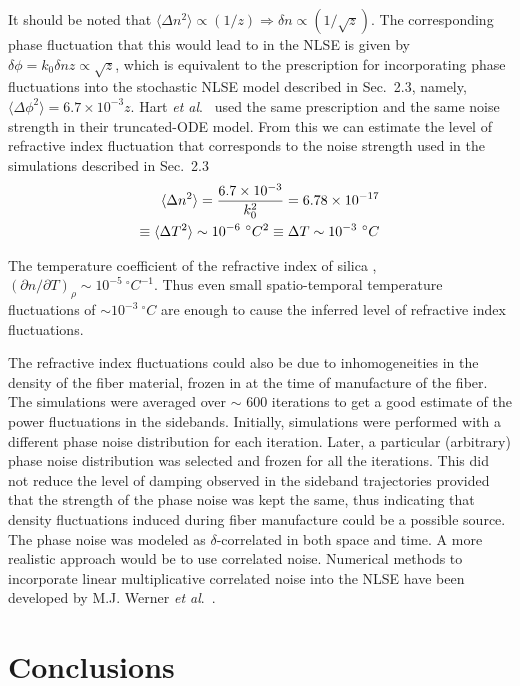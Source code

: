 It should be noted that $\langle \Delta n^2 \rangle \propto (1/z) \Rightarrow \delta n \propto  (1 / \sqrt{z})$. The corresponding phase fluctuation that this would lead to in the NLSE is given by $\delta \phi=k_{0} \delta n z \propto \sqrt {z}$, which is equivalent to the prescription for incorporating phase fluctuations into the stochastic NLSE model described in Sec.\ 2.3, namely,  $\langle \Delta \phi^2 \rangle = 6.7 \times 10^{-3}z$. Hart {\it et al}.\ \cite{hart1} used the same prescription and the same noise strength in their truncated-ODE model. From this we can estimate the level of refractive index fluctuation that corresponds to the noise strength used in the simulations described in Sec.\ 2.3
\begin{eqnarray}
\langle \Delta n^2 \rangle = {6.7 \times 10^{-3} \over k_0^2} = 6.78 \times 10^{-17} \nonumber\\
\equiv \langle \Delta T^{2} \rangle \sim 10^{-6}~{^\circ}C^2 \equiv \Delta T \sim 10^{-3}~{^\circ}C
\end{eqnarray}

The temperature coefficient of the refractive index of silica \cite{glenn},
$(\partial n / \partial T)_{\rho} \sim 10^{-5} ~{^\circ}C^{-1}$. Thus even small spatio-temporal temperature fluctuations of $\sim 10^{-3} ~{^\circ}C$ are enough to cause the inferred level of refractive index fluctuations.

The refractive index fluctuations could also be due to inhomogeneities in the
density of the fiber material, frozen in at the time of manufacture of the
fiber. The simulations were averaged over $\sim$ 600 iterations to get a good
estimate of the power fluctuations in the sidebands. Initially, simulations
were performed with a different phase noise distribution for each iteration.
Later, a particular (arbitrary) phase noise distribution was selected and
frozen for all the iterations.
This did not reduce the level of damping observed in the sideband trajectories
provided that the strength of the phase noise was kept the same, thus
indicating that density fluctuations induced during fiber manufacture could be
a possible source. The phase noise was modeled as $\delta$-correlated in
both space and time. A more realistic approach would be to use correlated
noise. Numerical methods to incorporate linear multiplicative correlated noise
into the NLSE have been developed by M.J. Werner {\it et al}.\ \cite{werner2}.

\section{Conclusions}

